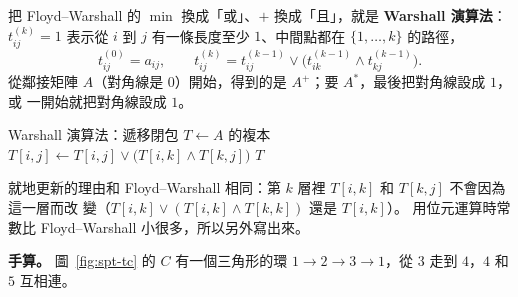把 Floyd--Warshall 的 $\min$ 換成「或」、$+$ 換成「且」，就是 \textbf{Warshall 演算法}：
$t_{ij}^{(k)} = 1$ 表示從 $i$ 到 $j$ 有一條長度至少 $1$、中間點都在 $\{1, \ldots, k\}$ 的路徑，
\[
t_{ij}^{(0)} = a_{ij}, \qquad t_{ij}^{(k)} = t_{ij}^{(k-1)} \lor \bigl( t_{ik}^{(k-1)} \land
t_{kj}^{(k-1)} \bigr).
\]
從鄰接矩陣 $A$（對角線是 $0$）開始，得到的是 $A^{+}$；要 $A^{*}$，最後把對角線設成 $1$，或
一開始就把對角線設成 $1$。

\begin{pseudo}[label=alg:spt-tc]{Warshall 演算法：遞移閉包}
    \State $T \gets A$ 的複本
                \State $T[i, j] \gets T[i, j] \lor \bigl( T[i, k] \land T[k, j] \bigr)$
            \EndFor
        \EndFor
    \EndFor
    \State \Return $T$
\EndFunction
\end{pseudo}

就地更新的理由和 Floyd--Warshall 相同：第 $k$ 層裡 $T[i, k]$ 和 $T[k, j]$ 不會因為這一層而改
變（$T[i, k] \lor (T[i, k] \land T[k, k])$ 還是 $T[i, k]$）。 用位元運算時常數比 Floyd--Warshall
小很多，所以另外寫出來。

\textbf{手算。} 圖~\ref{fig:spt-tc} 的 $C$ 有一個三角形的環 $1 \to 2 \to 3 \to 1$，從 $3$ 走到
$4$，$4$ 和 $5$ 互相連。

\begin{center}
\par\nopagebreak
{}
\label{fig:spt-tc}
\end{center}

